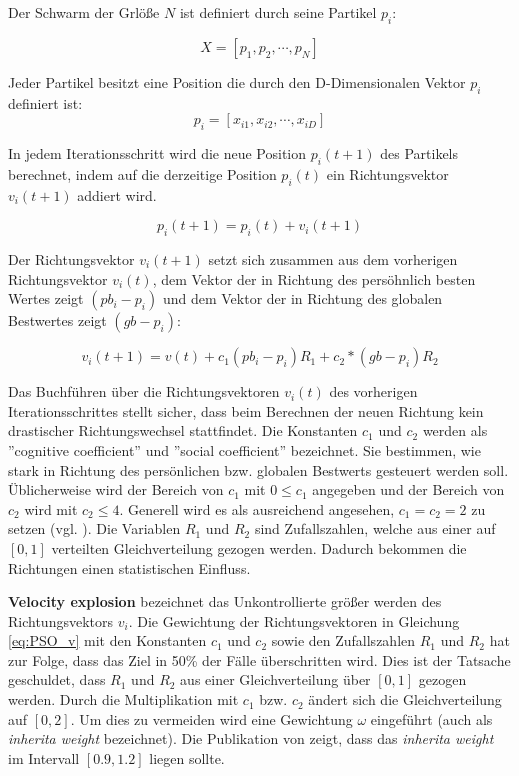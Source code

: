 Der Schwarm der Grlöße $N$ ist definiert durch seine Partikel $p_i$:

\begin{equation}\label{eq:PSO_X}
X = [p_{1},p_{2},\cdots,p_{N}]
\end{equation}

Jeder Partikel besitzt eine Position die durch den D-Dimensionalen Vektor $p_i$ definiert ist:
\begin{equation}\label{eq:PSO_p}
p_i = [x_{i1},x_{i2},\cdots,x_{iD}]
\end{equation}

In jedem Iterationsschritt wird die neue Position $p_i(t+1)$ des Partikels berechnet, indem auf die derzeitige Position $p_i(t)$ ein Richtungsvektor $v_i(t+1)$ addiert wird.

\begin{equation}\label{eq:PSO_pt1}
p_i(t+1) = p_i(t) + v_i(t+1)
\end{equation}

Der Richtungsvektor $v_i(t+1)$ setzt sich zusammen aus dem vorherigen Richtungsvektor $v_i(t)$,
dem Vektor der in Richtung des persöhnlich besten Wertes zeigt $(pb_i - p_i)$ und dem Vektor der in Richtung des globalen Bestwertes zeigt $(gb - p_i)$:

\begin{equation}\label{eq:PSO_v}
v_i(t+1) = v(t) + c_1(pb_i - p_i)R_1 + c_2*(gb - p_i)R_2 
\end{equation}

Das Buchführen über die Richtungsvektoren $v_i(t)$ des vorherigen Iterationsschrittes stellt sicher, dass beim Berechnen der neuen Richtung kein drastischer Richtungswechsel stattfindet.
Die Konstanten $c_1$ und $c_2$ werden als ''cognitive coefficient'' und ''social coefficient'' bezeichnet. Sie bestimmen, wie stark in Richtung des persönlichen bzw. globalen Bestwerts gesteuert werden soll. Üblicherweise wird der Bereich von $c_1$ mit $0 \leq c_1$ angegeben und
der Bereich von $c_2$ wird mit $c_2 \leq 4$. Generell wird es als ausreichend angesehen, $c_1=c_2=2$ zu setzen (vgl. \cite{MARINI2015153}).
Die Variablen $R_1$ und $R_2$ sind Zufallszahlen, welche aus einer auf $[0,1]$ verteilten Gleichverteilung gezogen werden. Dadurch bekommen die Richtungen einen statistischen Einfluss.

\textbf{Velocity explosion} bezeichnet das Unkontrollierte größer werden des Richtungsvektors $v_i$. Die Gewichtung der Richtungsvektoren in Gleichung \ref{eq:PSO_v} mit den Konstanten $c_1$ und $c_2$ sowie den Zufallszahlen $R_1$ und $R_2$ hat zur Folge, dass das Ziel in 50\% der Fälle überschritten wird. Dies ist der Tatsache geschuldet, dass $R_1$ und $R_2$ aus einer Gleichverteilung über $[0,1]$ gezogen werden. Durch die Multiplikation mit $c_1$ bzw. $c_2$ ändert sich die Gleichverteilung auf $[0,2]$. Um dies zu vermeiden wird eine Gewichtung $\omega$ eingeführt (auch als \textit{inherita weight} bezeichnet). Die Publikation von \citet{inheritaweight} zeigt, dass das \textit{inherita weight} im Intervall $[0.9,1.2]$ liegen sollte.

